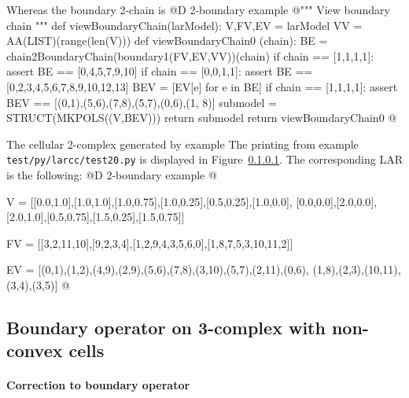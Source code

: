 \documentclass[11pt,oneside]{article}    %
\begin{document}
Whereas the boundary 2-chain is
@D 2-boundary example
@{""" View boundary chain """
def viewBoundaryChain(larModel):
    V,FV,EV = larModel
    VV = AA(LIST)(range(len(V)))
    def viewBoundaryChain0 (chain):
        BE = chain2BoundaryChain(boundary1(FV,EV,VV))(chain)
        if chain == [1,1,1,1]: assert BE == [0,4,5,7,9,10]
        if chain == [0,0,1,1]: assert BE == [0,2,3,4,5,6,7,8,9,10,12,13]
        BEV = [EV[e] for e in BE]
        if chain == [1,1,1,1]: assert BEV == [(0,1),(5,6),(7,8),(5,7),(0,6),(1, 8)]
        submodel = STRUCT(MKPOLS((V,BEV)))
        return submodel
    return viewBoundaryChain0
@}

The cellular 2-complex generated by example \texttt{}The printing from example \texttt{test/py/larcc/test20.py} is displayed in Figure~\ref{}.
The corresponding LAR is the following:
@D 2-boundary example
@{V = [[0.0,1.0],[1.0,1.0],[1.0,0.75],[1.0,0.25],[0.5,0.25],[1.0,0.0],
[0.0,0.0],[2.0,0.0],[2.0,1.0],[0.5,0.75],[1.5,0.25],[1.5,0.75]]

FV = [[3,2,11,10],[9,2,3,4],[1,2,9,4,3,5,6,0],[1,8,7,5,3,10,11,2]]

EV = [(0,1),(1,2),(4,9),(2,9),(5,6),(7,8),(3,10),(5,7),(2,11),(0,6),
(1,8),(2,3),(10,11),(3,4),(3,5)]
@}


\subsection{Boundary operator on 3-complex with non-convex cells}

\paragraph{Correction to boundary operator}
\end{document}
